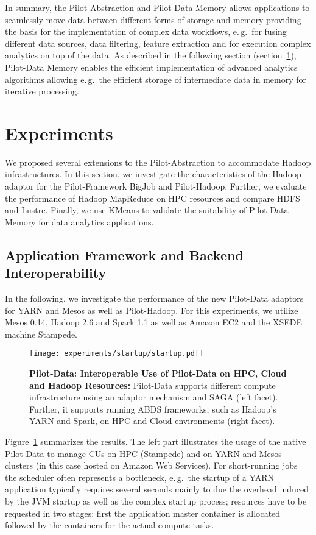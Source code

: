 \documentclass{sig-alternate}
\newcommand{\pilot}{Pilot\xspace}
\newcommand{\pilotdata}{Pilot-Data\xspace}
\newcommand{\pilotdatainmem}{Pilot-Data Memory\xspace}
\newcommand{\cus}{CUs\xspace}
\begin{document}
In summary, the \pilot-Abstraction and \pilotdatainmem allows applications to
seamlessly move data between different forms of storage and memory providing
the basis for the implementation of complex data workflows, e.\,g.\ for fusing
different data sources, data filtering, feature extraction and for execution
complex analytics on top of the data. As described in the following section
(section~\ref{sec:experiments}), \pilotdatainmem enables the efficient
implementation of advanced analytics algorithms allowing e.\,g.\ the efficient
storage of intermediate data in memory for iterative processing.


\section{Experiments}
\label{sec:experiments}

  
We proposed several extensions to the \pilot-Abstraction to accommodate Hadoop
infrastructures. In this section, we investigate the characteristics of the
Hadoop adaptor for the \pilot-Framework BigJob and \pilot-Hadoop. Further, we
evaluate the performance of Hadoop MapReduce on HPC resources and compare HDFS
and Lustre. Finally, we use KMeans to validate the suitability of
\pilotdatainmem for data analytics applications.

\subsection{Application Framework and Backend Interoperability}

In the following, we investigate the performance of the new \pilotdata adaptors
for YARN and Mesos as well as \pilot-Hadoop. For this experiments, we utilize
Mesos 0.14, Hadoop 2.6 and Spark 1.1 as well as Amazon EC2 and the XSEDE
machine Stampede.

\begin{figure}[t]
     \centering
     \texttt{[image: experiments/startup/startup.pdf]}
     \caption{\textbf{Pilot-Data: Interoperable Use of Pilot-Data on 
     HPC, Cloud and Hadoop Resources:} Pilot-Data supports different
     compute infrastructure using an adaptor mechanism and SAGA (left facet).
     Further, it supports running ABDS frameworks, such as Hadoop's YARN and
     Spark, on HPC and Cloud environments (right facet).}
     \label{fig:experiments_startup_startup}
 \end{figure}

Figure~\ref{fig:experiments_startup_startup} summarizes the
results. The left part illustrates the usage of the native Pilot-Data
to manage \cus on HPC (Stampede) and on YARN and Mesos clusters (in
this case hosted on Amazon Web Services). For short-running jobs the
scheduler often represents a bottleneck, e.\,g.\ the startup of a
YARN application typically requires several seconds mainly to due the
overhead induced by the JVM startup as well as the complex startup
process; resources have to be requested in two stages: first the
application master container is allocated followed by the containers
for the actual compute tasks.
\end{document}
